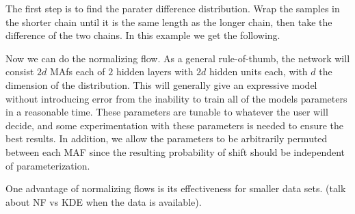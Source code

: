 The first step is to find the parater difference distribution. 
Wrap the samples in the shorter chain until it is the same length as the longer chain, then take the difference of the two chains. 
In this example we get the following.

Now we can do the normalizing flow. As a general rule-of-thumb, the network will consist $2d$ MAfs each of $2$ hidden layers with $2d$ hidden units each, with $d$ the dimension of the distribution.
This will generally give an expressive model without introducing error from the inability to train all of the models parameters in a reasonable time. 
These parameters are tunable to whatever the user will decide, and some experimentation with these parameters is needed to ensure the best results.
In addition, we allow the parameters to be arbitrarily permuted between each MAF since the resulting probability of shift should be independent of parameterization.

One advantage of normalizing flows is its effectiveness for smaller data sets. (talk about NF vs KDE when the data is available).